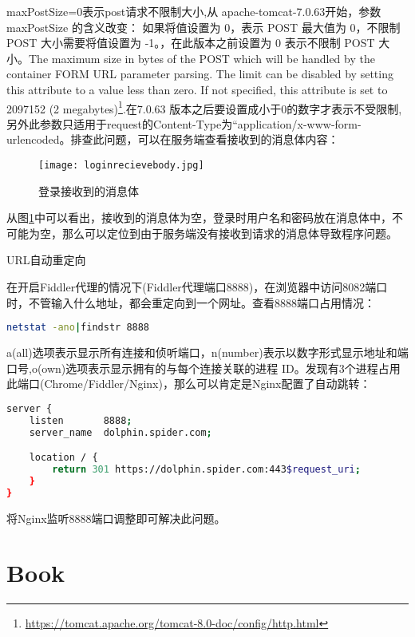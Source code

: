 \documentclass[8pt]{book}
\makeatletter
\numberwithin{dummy}{section}
\theoremstyle{ocrenumbox}
\theoremstyle{blacknumex}
\theoremstyle{blacknumbox}
\theoremstyle{ocrenum}
\renewcommand{\subsection}{\@startsection {subsection}{2}{\z@}
	{-3ex \@plus -0.1ex \@minus -.4ex}
	{0.5ex \@plus.2ex }
	{\normalfont\sffamily\bfseries}}
\makeatother
\begin{document}
maxPostSize=0表示post请求不限制大小,从 apache-tomcat-7.0.63开始，参数 maxPostSize 的含义改变： 如果将值设置为 0，表示 POST 最大值为 0，不限制 POST 大小需要将值设置为 -1。，在此版本之前设置为 0 表示不限制 POST 大小。The maximum size in bytes of the POST which will be handled by the container FORM URL parameter parsing. The limit can be disabled by setting this attribute to a value less than zero. If not specified, this attribute is set to 2097152 (2 megabytes)\footnote{\url{https://tomcat.apache.org/tomcat-8.0-doc/config/http.html}}.在7.0.63 版本之后要设置成小于0的数字才表示不受限制,另外此参数只适用于request的Content-Type为“application/x-www-form-urlencoded。排查此问题，可以在服务端查看接收到的消息体内容：

\begin{figure}[htbp]
	\centering
	\texttt{[image: loginrecievebody.jpg]}
	\caption{登录接收到的消息体}
	\label{fig:loginrecievebody}
\end{figure}

从图\ref{fig:loginrecievebody}中可以看出，接收到的消息体为空，登录时用户名和密码放在消息体中，不可能为空，那么可以定位到由于服务端没有接收到请求的消息体导致程序问题。

\subsection{URL自动重定向}

在开启Fiddler代理的情况下(Fiddler代理端口8888)，在浏览器中访问8082端口时，不管输入什么地址，都会重定向到一个网址。查看8888端口占用情况：

\begin{lstlisting}[language=Bash]
netstat -ano|findstr 8888
\end{lstlisting}

a(all)选项表示显示所有连接和侦听端口，n(number)表示以数字形式显示地址和端口号,o(own)选项表示显示拥有的与每个连接关联的进程 ID。发现有3个进程占用此端口(Chrome/Fiddler/Nginx)，那么可以肯定是Nginx配置了自动跳转：

\begin{lstlisting}[language=Bash]
server {
    listen       8888;
    server_name  dolphin.spider.com;      

    location / {
        return 301 https://dolphin.spider.com:443$request_uri;
    }
}
\end{lstlisting}

将Nginx监听8888端口调整即可解决此问题。


\part{Book}
\end{document}
